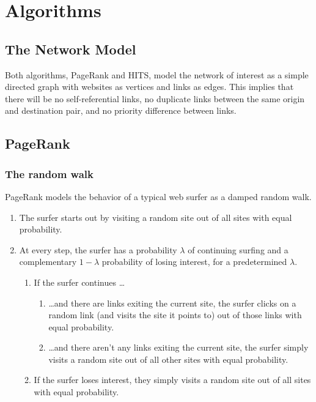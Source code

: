 \documentclass[12pt, titlepage, twoside]{amsart}
\begin{document}
\section{Algorithms}

\subsection{The Network Model}

Both algorithms, PageRank and HITS, model the network of interest as a simple directed graph with websites as vertices
and links as edges.
This implies that there will be no self-referential links, no duplicate links between the same origin
and destination pair, and no priority difference between links.

\subsection{PageRank}

\subsubsection{The random walk}

PageRank models the behavior of a typical web surfer as a damped random walk.

\begin{enumerate}
  \item The surfer starts out by visiting a random site out of all sites with equal probability.
  \item At every step, the surfer has a probability $\lambda$ of continuing surfing and a complementary
    $1 - \lambda$ probability of losing interest, for a predetermined $\lambda$.
  
    \begin{enumerate}
      \item If the surfer continues \ldots

        \begin{enumerate}
          \item \ldots and there are links exiting the current site, the surfer
            clicks on a random link (and visits the site it points to) out of those links with equal probability.
          \item \ldots and there aren't any links exiting the current site, the surfer simply
            visits a random site out of all other sites with equal probability.
        \end{enumerate}

      \item If the surfer loses interest, they simply visits a random site out of all sites with equal probability.
    \end{enumerate}

\end{enumerate}
\end{document}
